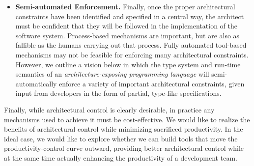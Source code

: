 \documentclass[runningheads]{llncs}
\begin{document}
\begin{sloppypar}
\begin{itemize}

\item \textbf{Semi-automated Enforcement.}  Finally, once the proper architectural constraints have been identified and specified in a central way, the architect must be confident that they will be followed in the implementation of the software system.  Process-based mechanisms are important, but are also as fallible as the humans carrying out that process.  Fully automated tool-based mechanisms may not be feasible for enforcing many architectural constraints.  However, we outline a vision below in which the type system and run-time semantics of an \emph{architecture-exposing programming language} will semi-automatically enforce a variety of important architectural constraints, given input from developers in the form of partial, type-like specifications.


\end{itemize}

Finally, while architectural control is clearly desirable, in practice any mechanisms used to achieve it must be cost-effective.  We would like to realize the benefits of architectural control while minimizing sacrificed productivity.  In the ideal case, we would like to explore whether we can build tools that move the productivity-control curve outward, providing better architectural control while at the same time actually enhancing the productivity of a development team.



\end{sloppypar}
\end{document}

